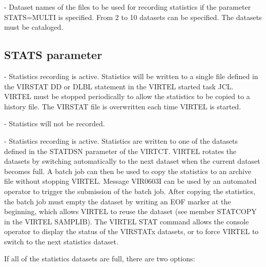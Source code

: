 \documentclass[letterpaper,10pt,english]{sphinxmanual}
\begin{document}
 - Dataset names of the files to be used for recording statistics if the parameter STATS=MULTI is specified. From 2 to 10 datasets can be specified. The datasets must be cataloged.


\subsection{STATS parameter}
\label{\detokenize{Installation_Guide:stats-parameter}}\label{\detokenize{Installation_Guide:index-117}}
\begin{sphinxVerbatim}[commandchars=\\\{\}]
     
\end{sphinxVerbatim}

 - Statistics recording is active. Statistics will be written to a single file defined in the VIRSTAT DD or DLBL statement in the VIRTEL started task JCL. VIRTEL must be stopped periodically to allow the statistics to be copied to a history file. The VIRSTAT file is overwritten each time VIRTEL is started.

 - Statistics will not be recorded.

 - Statistics recording is active. Statistics are written to one of the datasets defined in the STATDSN parameter of the VIRTCT. VIRTEL rotates the datasets by switching automatically to the next dataset when the current dataset becomes full. A batch job can then be used to copy the statistics to an archive file without stopping VIRTEL. Message VIR0603I can be used by an automated operator to trigger the submission of the batch job. After copying the statistics, the batch job must empty the dataset by writing an EOF marker at the beginning, which allows VIRTEL to reuse the dataset (see member STATCOPY in the VIRTEL SAMPLIB).
The VIRTEL STAT command allows the console operator to display the status of the VIRSTATx datasets, or to force VIRTEL to switch to the next statistics dataset.

If all of the statistics datasets are full, there are two options:
\end{document}
